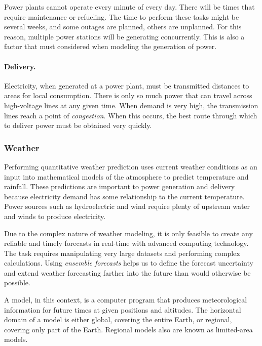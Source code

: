Power plants cannot operate every minute of every day. There will be times that require maintenance or refueling. The time to perform these tasks might be several weeks, and some outages are planned, others are unplanned. For this reason, multiple power stations will be generating concurrently. This is also a factor that must considered when modeling the generation of power.

\paragraph{Delivery.} Electricity, when generated at a power plant, must be transmitted distances to areas for local consumption. There is only so much power that can travel across high-voltage lines at any given time. When demand is very high, the transmission lines reach a point of \emph{congestion}. When this occurs, the best route through which to deliver power must be obtained very quickly.

\subsubsection{Weather}
Performing quantitative weather prediction uses current weather conditions as an input into mathematical models of the atmosphere to predict temperature and rainfall.
These predictions are important to power generation and delivery because electricity demand has some relationship to the current temperature. Power sources such as hydroelectric and wind require plenty of upstream water and winds to produce electricity.

Due to the complex nature of weather modeling, it is only feasible to create any reliable and timely forecasts in real-time with advanced computing technology. The task requires manipulating very large datasets and performing complex calculations. Using \emph{ensemble forecasts} helps us to define the forecast uncertainty and extend weather forecasting farther into the future than would otherwise be possible.

A model, in this context, is a computer program that produces meteorological information for future times at given positions and altitudes. The horizontal domain of a model is either global, covering the entire Earth, or regional, covering only part of the Earth. Regional models also are known as limited-area models.

